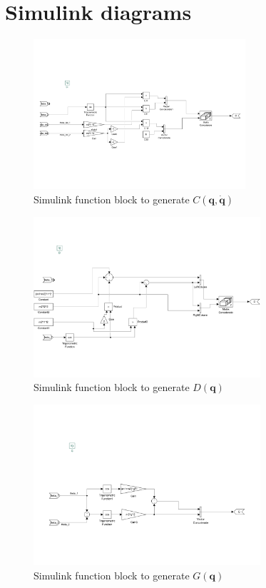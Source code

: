 \documentclass[a4paper]{scrartcl}
\begin{document}
\clearpage
\appendix
\appendixpage
\addappheadtotoc
\section{Simulink diagrams}\label{sec:simulink}
\begin{figure}[ht]
	\centering
	\includegraphics[width=0.70\textwidth]{fig/C_func.pdf}
	\caption{Simulink function block to generate $C(\bm{q}, \dot{\bm{q}})$}
	\label{fig:genC}
\end{figure}
\begin{figure}[ht]
	\centering
	\includegraphics[width=0.75\textwidth]{fig/D_func.pdf}
	\caption{Simulink function block to generate $D(\bm{q})$}
	\label{fig:genD}
\end{figure}
\begin{figure}[ht]
	\centering
	\includegraphics[width=0.75\textwidth]{fig/G_func.pdf}
	\caption{Simulink function block to generate $G(\bm{q})$}
	\label{fig:genG}
\end{figure}
\end{document}
